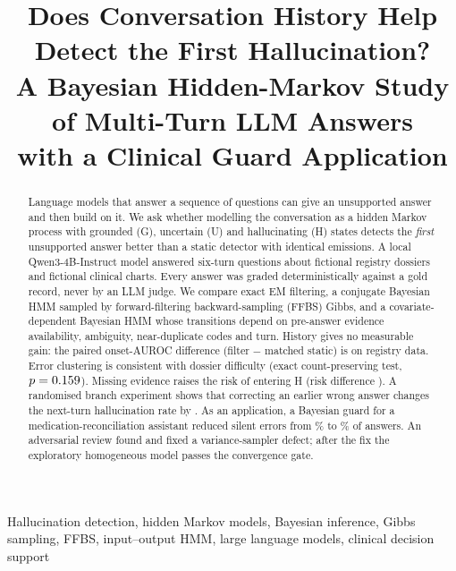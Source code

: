 \documentclass[conference]{IEEEtran}
\begin{document}
\title{Does Conversation History Help Detect the First Hallucination?\\ A Bayesian Hidden-Markov Study of Multi-Turn LLM Answers\\ with a Clinical Guard Application}
\author{
}
\maketitle

\begin{abstract}
Language models that answer a sequence of questions can give an unsupported answer and then build on it. We ask whether modelling the conversation as a hidden Markov process with grounded (G), uncertain (U) and hallucinating (H) states detects the \emph{first} unsupported answer better than a static detector with identical emissions. A local Qwen3-4B-Instruct model answered six-turn questions about \NRegDossiers{} fictional registry dossiers and \NClinDossiers{} fictional clinical charts. Every answer was graded deterministically against a gold record, never by an LLM judge. We compare exact EM filtering, a conjugate Bayesian HMM sampled by forward-filtering backward-sampling (FFBS) Gibbs, and a covariate-dependent Bayesian HMM whose transitions depend on pre-answer evidence availability, ambiguity, near-duplicate codes and turn. History gives no measurable gain: the paired onset-AUROC difference (filter $-$ matched static) is \PrimRegL{} on registry data. Error clustering is consistent with dossier difficulty (exact count-preserving test, $p=0.159$). Missing evidence raises the risk of entering H (risk difference \EvidRegX{}). A randomised branch experiment shows that correcting an earlier wrong answer changes the next-turn hallucination rate by \CorrReg{}. As an application, a Bayesian guard for a medication-reconciliation assistant reduced silent errors from \GuardSilentU\% to \GuardSilentG\% of answers. An adversarial review found and fixed a variance-sampler defect; after the fix the exploratory homogeneous model passes the convergence gate.
\end{abstract}

\begin{IEEEkeywords}
Hallucination detection, hidden Markov models, Bayesian inference, Gibbs sampling, FFBS, input--output HMM, large language models, clinical decision support
\end{IEEEkeywords}
\end{document}
